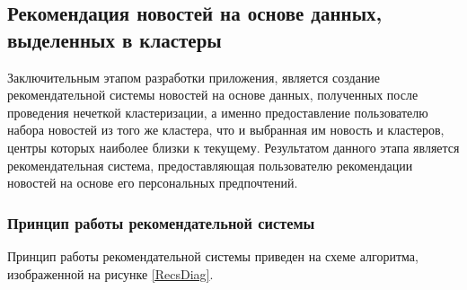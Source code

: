 \subsection{Рекомендация новостей на основе данных, выделенных в кластеры}

Заключительным этапом разработки приложения, является создание рекомендательной системы новостей на основе данных, полученных после проведения нечеткой кластеризации, а именно предоставление пользователю набора новостей из того же кластера, что и выбранная им новость и кластеров, центры которых наиболее близки к текущему. Результатом данного этапа является рекомендательная система, предоставляющая пользователю рекомендации новостей на основе его персональных предпочтений.

\subsubsection{Принцип работы рекомендательной системы}

Принцип работы рекомендательной системы приведен на схеме алгоритма, изображенной на рисунке \ref{RecsDiag}.

